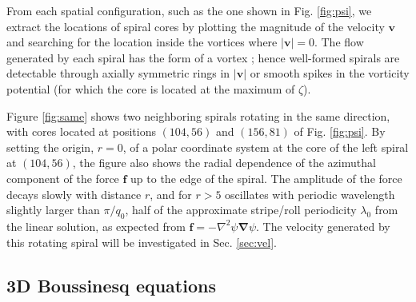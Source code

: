 \documentclass[preprint,prx,floatfix]{revtex4-1}
\begin{document}
From each spatial configuration, such as the one shown in Fig. \ref{fig:psi}, we extract the locations of spiral cores by plotting the magnitude of the velocity $\mathbf{v}$ and searching for the location inside the vortices where $|\mathbf{v}| = 0$. The flow generated by each spiral has the form of a vortex \cite{karimi2011exploring,karimi2019erratum}; hence well-formed spirals are detectable through axially symmetric rings in $|\mathbf{v}|$ or smooth spikes in the vorticity potential (for which the core is located at the maximum of $\zeta$).

Figure \ref{fig:same} shows two neighboring spirals rotating in the same direction, with cores located at positions $(104,56)$ and $(156,81)$ of Fig. \ref{fig:psi}. By setting the origin, $r = 0$, of a polar coordinate system at the core of the left spiral at $(104,56)$, the figure also shows the radial dependence of the azimuthal component of the force $\mathbf{f}$ up to the edge of the spiral. The amplitude of the force decays slowly with distance $r$, and for $r > 5$ oscillates with periodic wavelength slightly larger than $\pi / q_{0}$, half of the approximate stripe/roll periodicity $\lambda_0$ from the linear solution, as expected from $\mathbf{f}=-\nabla^2\psi\bm{\nabla}\psi$. The velocity generated by this rotating spiral will be investigated in Sec. \ref{sec:vel}.

\subsection{3D Boussinesq equations}
\label{sec:bsq}
\end{document}
